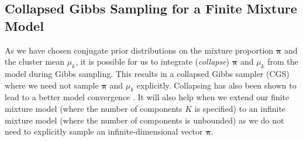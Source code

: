 \subsection{Collapsed Gibbs Sampling for a Finite Mixture Model}

As we have chosen conjugate prior distributions on the mixture proportion $\boldsymbol{\pi}$ and the cluster mean $\mu_k$, it is possible for us to integrate (\emph{collapse}) $\boldsymbol{\pi}$ and $\mu_k$ from the model during Gibbs sampling. This results in a collapsed Gibbs sampler (CGS) where we need not sample $\boldsymbol{\pi}$ and $\mu_k$ explicitly. Collapsing has also been shown to lead to a better model convergence \cite{gelman2014bayesian}. It will also help when we extend our finite mixture model (where the number of components $K$ is specified) to an infinite mixture model (where the number of components is unbounded) as we do not need to explicitly sample an infinite-dimensional vector $\boldsymbol{\pi}$. 

